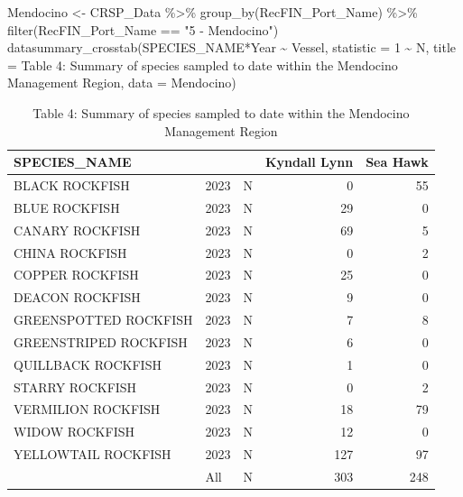 \documentclass[
  letterpaper,
  DIV=11,
  numbers=noendperiod]{scrartcl}
\newenvironment{Shaded}{\begin{snugshade}}{\end{snugshade}}
\newcommand{\AttributeTok}[1]{\textcolor[rgb]{0.40,0.45,0.13}{#1}}
\newcommand{\DecValTok}[1]{\textcolor[rgb]{0.68,0.00,0.00}{#1}}
\newcommand{\FunctionTok}[1]{\textcolor[rgb]{0.28,0.35,0.67}{#1}}
\newcommand{\NormalTok}[1]{\textcolor[rgb]{0.00,0.23,0.31}{#1}}
\newcommand{\OtherTok}[1]{\textcolor[rgb]{0.00,0.23,0.31}{#1}}
\newcommand{\SpecialCharTok}[1]{\textcolor[rgb]{0.37,0.37,0.37}{#1}}
\newcommand{\StringTok}[1]{\textcolor[rgb]{0.13,0.47,0.30}{#1}}
\begin{document}
\begin{Shaded}
\begin{Highlighting}[]
\NormalTok{Mendocino }\OtherTok{\textless{}{-}}\NormalTok{ CRSP\_Data }\SpecialCharTok{\%\textgreater{}\%}
  \FunctionTok{group\_by}\NormalTok{(RecFIN\_Port\_Name) }\SpecialCharTok{\%\textgreater{}\%}
  \FunctionTok{filter}\NormalTok{(RecFIN\_Port\_Name }\SpecialCharTok{==} \StringTok{"5 {-} Mendocino"}\NormalTok{)}
\FunctionTok{datasummary\_crosstab}\NormalTok{(SPECIES\_NAME}\SpecialCharTok{*}\NormalTok{Year }\SpecialCharTok{\textasciitilde{}}\NormalTok{ Vessel, }\AttributeTok{statistic =} \DecValTok{1} \SpecialCharTok{\textasciitilde{}}\NormalTok{ N, }\AttributeTok{title =} \StringTok{\textquotesingle{}Table 4: Summary of species sampled to date within the Mendocino Management Region\textquotesingle{}}\NormalTok{, }\AttributeTok{data =}\NormalTok{ Mendocino)}
\end{Highlighting}
\end{Shaded}

\begin{table}

\caption{Table 4: Summary of species sampled to date within the Mendocino Management Region}
\centering
\begin{tabular}[t]{lllrr}
\toprule
SPECIES\_NAME &   &    & Kyndall Lynn & Sea Hawk\\
\midrule
BLACK ROCKFISH & 2023 & N & 0 & 55\\
BLUE ROCKFISH & 2023 & N & 29 & 0\\
CANARY ROCKFISH & 2023 & N & 69 & 5\\
CHINA ROCKFISH & 2023 & N & 0 & 2\\
COPPER ROCKFISH & 2023 & N & 25 & 0\\
DEACON ROCKFISH & 2023 & N & 9 & 0\\
GREENSPOTTED ROCKFISH & 2023 & N & 7 & 8\\
GREENSTRIPED ROCKFISH & 2023 & N & 6 & 0\\
QUILLBACK ROCKFISH & 2023 & N & 1 & 0\\
STARRY ROCKFISH & 2023 & N & 0 & 2\\
VERMILION ROCKFISH & 2023 & N & 18 & 79\\
WIDOW ROCKFISH & 2023 & N & 12 & 0\\
YELLOWTAIL ROCKFISH & 2023 & N & 127 & 97\\
 & All & N & 303 & 248\\
\bottomrule
\end{tabular}
\end{table}
\end{document}
